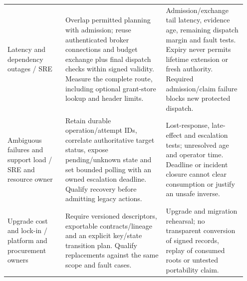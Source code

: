 {\begin{longtable}{@{}L{0.23\linewidth}L{0.40\linewidth}L{0.32\linewidth}@{}}
\addlinespace
Latency and dependency outages / SRE & Overlap permitted planning with admission; reuse authenticated broker connections and budget exchange plus final dispatch checks within signed validity. Measure the complete route, including optional grant-store lookup and header limits. & Admission/exchange tail latency, evidence age, remaining dispatch margin and fault tests. Expiry never permits lifetime extension or fresh authority. Required admission/claim failure blocks new protected dispatch.\\
\addlinespace
Ambiguous failures and support load / SRE and resource owner & Retain durable operation/attempt IDs, correlate authoritative target status, expose pending/unknown state and set bounded polling with an owned escalation deadline. Qualify recovery before admitting legacy actions. & Lost-response, late-effect and escalation tests; unresolved age and operator time. Deadline or incident closure cannot clear consumption or justify an unsafe inverse.\\
\addlinespace
Upgrade cost and lock-in / platform and procurement owners & Require versioned descriptors, exportable contracts/lineage and an explicit key/state transition plan. Qualify replacements against the same scope and fault cases. & Upgrade and migration rehearsal; no transparent conversion of signed records, replay of consumed roots or untested portability claim.\\
\end{longtable}
}
